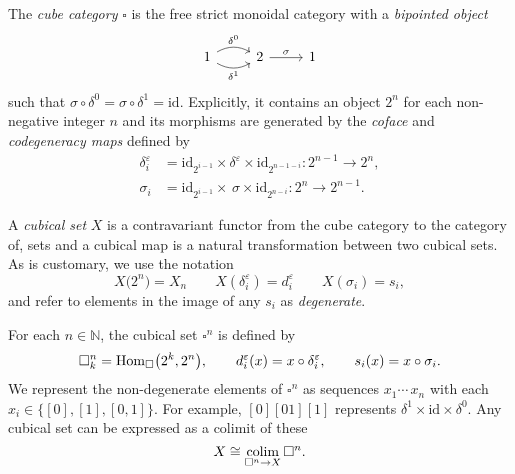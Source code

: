 The \textit{cube category} $\square$ is the free strict monoidal category with a \textit{bipointed object}
\begin{equation*}
\begin{tikzcd}
1 \arrow[r, bend left, "\delta^0"] \arrow[r, bend right, "\delta^1"'] & 2 \arrow[r, "\sigma"] & 1
\end{tikzcd}
\end{equation*}
such that $\sigma \circ \delta^0 = \sigma \circ \delta^1 = \mathrm{id}$.
Explicitly, it contains an object $2^n$ for each non-negative integer $n$ and its morphisms are generated by the \textit{coface} and \textit{codegeneracy maps} defined by
\begin{align*}
\delta_i^\varepsilon & = \mathrm{id}_{2^{i-1}} \times \delta^\varepsilon \times \mathrm{id}_{2^{n-1-i}} \colon 2^{n-1} \to 2^n, \\
\sigma_i & = \mathrm{id}_{2^{i-1}} \times \, \sigma \times \mathrm{id}_{2^{n-i}} \colon 2^{n} \to 2^{n-1}.
\end{align*}

A \textit{cubical set} $X$ is a contravariant functor from the cube category to the category of, sets and a cubical map is a natural transformation between two cubical sets.
As is customary, we use the notation
\begin{equation*}
X\big( 2^n \big) = X_n \qquad X(\delta^\varepsilon_i) = d^\varepsilon_i \qquad X(\sigma_i) = s_i,
\end{equation*}
and refer to elements in the image of any $s_i$ as \textit{degenerate}.

For each $n \in \mathbb{N}$, the cubical set $\square^n$ is defined by
\begin{equation*}
\square^n_k = \mathrm{Hom}_{\square} \big( 2^k, 2^n \big), \qquad
d^\varepsilon_i(x) = x \circ \delta^\varepsilon_i, \qquad
s_i(x) = x \circ \sigma_i.
\end{equation*}
We represent the non-degenerate elements of $\square^n$ as sequences $x_1 \cdots\, x_n$ with each $x_i \in \big\{[0], [1], [0,1]\big\}$.
For example, $[0][01][1]$ represents $\delta^1 \times \mathrm{id} \times \delta^0$.
Any cubical set can be expressed as a colimit of these
\begin{equation*}
X \cong \operatorname*{colim}_{\square^n \to X} \square^n.
\end{equation*}

